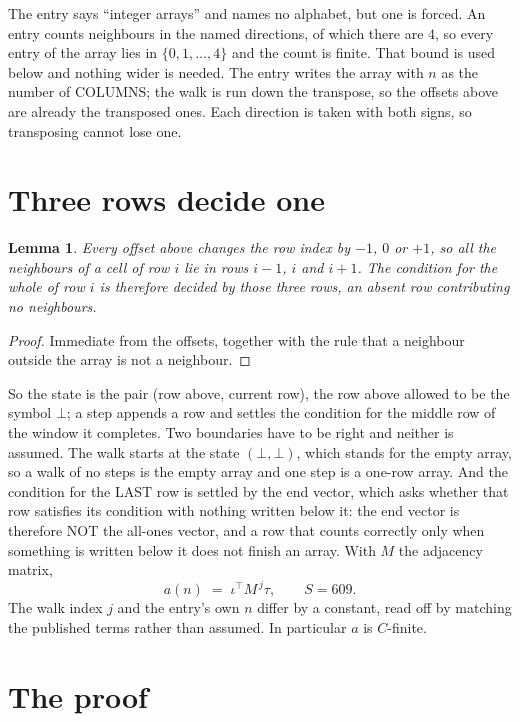 \documentclass[11pt,a4paper]{article}
\theoremstyle{plain}
\newtheorem{lemma}[theorem]{Lemma}
\theoremstyle{definition}
\begin{document}
The entry says ``integer arrays'' and names no alphabet, but one is forced. An entry counts
neighbours in the named directions, of which there are $4$, so every entry of the array
lies in $\{0,1,\dots,4\}$ and the count is finite. That bound is used below and
nothing wider is needed. The entry writes the array with $n$ as the number of COLUMNS; the walk is run down the transpose, so the offsets above are already the transposed ones. Each direction is taken with both signs, so transposing cannot lose one.

\section{Three rows decide one}

\begin{lemma}\label{lem:win}
Every offset above changes the row index by $-1$, $0$ or $+1$, so all the neighbours of a cell
of row $i$ lie in rows $i-1$, $i$ and $i+1$. The condition for the whole of row $i$ is
therefore decided by those three rows, an absent row contributing no neighbours.
\end{lemma}

\begin{proof}
Immediate from the offsets, together with the rule that a neighbour outside the array is not a
neighbour.
\end{proof}

So the state is the pair (row above, current row), the row above allowed to be the symbol
$\bot$; a step appends a row and settles the condition for the middle row of the window it
completes. Two boundaries have to be right and neither is assumed. The walk starts at the state
$(\bot,\bot)$, which stands for the empty array, so a walk of no steps is the empty array and
one step is a one-row array. And the condition for the LAST row is settled by the end vector,
which asks whether that row satisfies its condition with nothing written below it: the end
vector is therefore NOT the all-ones vector, and a row that counts correctly only when
something is written below it does not finish an array. With $M$ the adjacency matrix,
\[
a(n)\;=\;\iota^{\!\top}M^{\,j}\tau ,\qquad S=609.
\]
The walk index $j$ and the entry's own $n$ differ by a constant, read off by matching the
published terms rather than assumed. In particular $a$ is $C$-finite.

\section{The proof}
\end{document}

